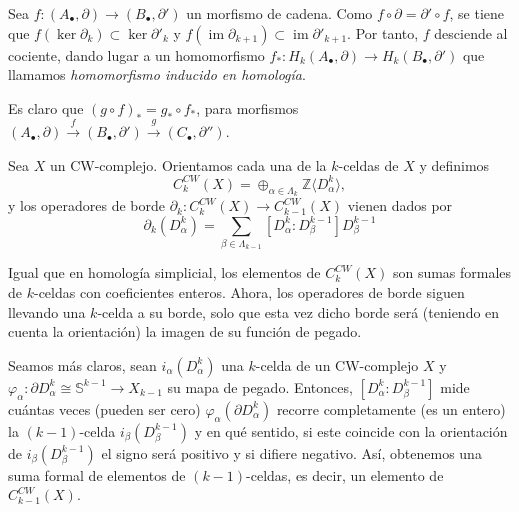 \begin{definition}
    Sea $f \colon (A_\bullet, \partial) \to (B_\bullet, \partial')$ un morfismo de cadena. Como $f \circ \partial = \partial' \circ f$, se tiene que
    $f(\ker \partial_k) \subset \ker \partial'_k$ y $f(\operatorname{im} \partial_{k+1}) \subset \operatorname{im} \partial'_{k+1}$. Por tanto, \( f \) desciende al cociente, dando lugar a un homomorfismo $f_* \colon H_k(A_\bullet, \partial) \to H_k(B_\bullet, \partial')$ que llamamos \textit{homomorfismo inducido en homología}.

\end{definition}
\begin{remark}
    Es claro que $(g \circ f)_* = g_* \circ f_*$,
    para morfismos $(A_\bullet, \partial) \xrightarrow{f} (B_\bullet, \partial') \xrightarrow{g} (C_\bullet, \partial'')$.
\end{remark}

\bigskip

\begin{definition}
    Sea $X$ un CW-complejo. Orientamos cada una de la $k$-celdas de $X$ y definimos
    \begin{equation*}
        C^{CW}_k(X) = \oplus_{\alpha\in\Lambda_k} \mathbb{Z} \langle D^k_{\alpha}\rangle,
    \end{equation*}
    y los operadores de borde $\partial_k : C^{CW}_k(X) \to C^{CW}_{k-1}(X)$ vienen dados por 
    \begin{equation*}
        \partial_k(D^k_{\alpha}) = \sum_{\beta\in\Lambda_{k-1}}[D^k_{\alpha}:D^{k-1}_{\beta}]D^{k-1}_{\beta}
    \end{equation*}
\end{definition}


Igual que en homología simplicial, los elementos de $C^{CW}_k(X)$ son sumas formales de $k$-celdas con coeficientes enteros. Ahora, los operadores de borde siguen llevando una $k$-celda a su borde, solo que esta vez dicho borde será (teniendo en cuenta la orientación) la imagen de su función de pegado. 

Seamos más claros, sean $i_{\alpha}(D^k_{\alpha})$ una $k$-celda de un CW-complejo $X$ y $\varphi_{\alpha}: \partial D_{\alpha}^k \cong \mathbb{S}^{k-1} \to X_{k-1}$ su mapa de pegado. Entonces, $[D^k_{\alpha}:D^{k-1}_{\beta}]$ mide cuántas veces (pueden ser cero) $\varphi_{\alpha}(\partial D_{\alpha}^k)$ recorre completamente (es un entero) la $(k-1)$-celda $i_{\beta}(D^{k-1}_{\beta})$ y en qué sentido, si este coincide con la orientación de $i_{\beta}(D^{k-1}_{\beta})$ el signo será positivo y si difiere negativo. Así, obtenemos una suma formal de elementos de $(k-1)$-celdas, es decir, un elemento de $C^{CW}_{k-1}(X)$. 

